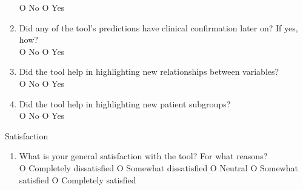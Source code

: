 \begin{framed}
\begin{enumerate}[resume]
		O No O Yes
		\item Did any of the tool's predictions have clinical confirmation later on?  If yes, how? \\
		O No O Yes
		\item Did the tool help in highlighting new relationships between variables? \\
		O No O Yes
		\item Did the tool help in highlighting new patient subgroups? \\
		O No O Yes
	\end{enumerate}
	{\Large Satisfaction}
	\begin{enumerate}[resume]
		\item What is your general satisfaction with the tool? For what reasons? \\
		O Completely dissatisfied O Somewhat dissatisfied O Neutral O Somewhat satisfied O Completely satisfied
	\end{enumerate}
	\label{ann:questionnaire}
\end{framed}


